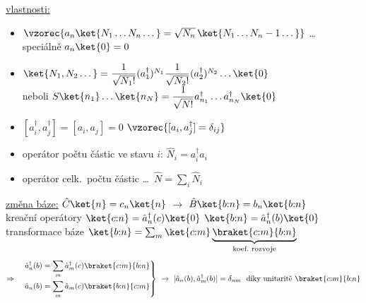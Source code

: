 \underline{vlastnosti:}
\begin{itemize}
  \item $\vzorec{a_n\ket{N_1\dots N_n\dots} = \sqrt{N_n}\,\ket{N_1\dots N_n-1\dots}}$ \quad \dots\  \\
        speciálně \quad $a_n\ket{0} = 0$ \\
  \item $\ket{N_1,N_2\dots} = \dfrac{1}{\sqrt{N_1!}}(a_1^\dagger)^{N_1}\dfrac{1}{\sqrt{N_2!}}(a_2^\dagger)^{N_2}\dots\ket{0}$ \\
        neboli \quad $S\ket{n_1}\dots\ket{n_N} = \dfrac{1}{\sqrt{N!}}a_{n_1}^\dagger\dots a_{n_N}^\dagger\ket{0}$ \quad
  \item $[a_i^\dagger,a_j^\dagger] = [a_i,a_j] = 0$ \qquad $\vzorec{[a_i,a_j^\dagger] = \delta_{ij}}$ \\
         \qquad
  \item operátor počtu částic ve stavu $i$: \quad $\hat N_i = a_i^\dagger a_i$
  \item operátor celk.\ počtu částic \dots\ $\hat N = \sum_i\hat N_i$
\end{itemize}

\underline{změna báze:} \quad $\hat C\ket{n} = c_n\ket{n}$ \quad $\to$ \quad $\hat B\ket{b{:}n} = b_n\ket{b{:}n}$ \\
kreační operátory \quad $\ket{c{:}n} = \hat a_n^\dagger(c)\ket{0}$ \qquad $\ket{b{:}n} = \hat a_n^\dagger(b)\ket{0}$ \\
transformace báze \quad $\ket{b{:}n} = \sum_m\ket{c{:}m}\underbrace{\braket{c{:}m}{b{:}n}}_{\text{koef.\ rozvoje}}$
\[
  \Rightarrow\quad
  \left.\begin{aligned}
    \hat a_n^\dagger(b) &= \sum_m\hat a_m^\dagger(c)\braket{c{:}m}{b{:}n} \\
    \hat a_n(b) &= \sum_m\hat a_m(c)\braket{b{:}n}{c{:}m}
  \end{aligned}\right\}
  \ \to\ [\hat a_n(b),\hat a_m^\dagger(b)] = \delta_{nm}\ \ \text{díky unitaritě } \braket{c{:}m}{b{:}n}
\]


